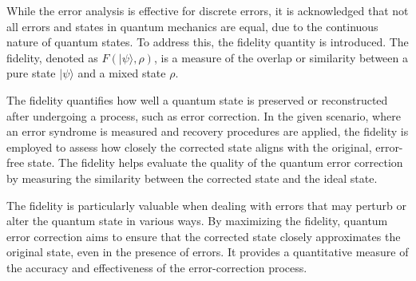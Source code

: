 \documentclass[12pt]{report}
\begin{document}
\begin{minipage}{1 \textwidth}
		While the error analysis is effective for discrete errors, it is acknowledged that not all errors and states in quantum mechanics are equal, due to the continuous nature of quantum states. To address this, the fidelity quantity is introduced. \newline
		The fidelity, denoted as $F(|\psi \rangle, \rho)$, is a measure of the overlap or similarity between a pure state $| \psi \rangle$  and a mixed state $\rho$. \newline
		
		The fidelity quantifies how well a quantum state is preserved or reconstructed after undergoing a process, such as error correction. 
		In the given scenario, where an error syndrome is measured and recovery procedures are applied, the fidelity is employed to assess how closely the corrected state aligns with the original, error-free state. 
		The fidelity helps evaluate the quality of the quantum error correction by measuring the similarity between the corrected state and the ideal state. \newline
		
		
		
	\end{minipage}
	
	\begin{minipage}{1 \textwidth}
		
		The fidelity is particularly valuable when dealing with errors that may perturb or alter the quantum state in various ways. By maximizing the fidelity, quantum error correction aims to ensure that the corrected state closely approximates the original state, even in the presence of errors. It provides a quantitative measure of the accuracy and effectiveness of the error-correction process. \newline
		
	\end{minipage}
	
	\begin{minipage}{1 \textwidth}
		
	\end{minipage}
	
	\begin{minipage}{1 \textwidth}
		
	\end{minipage}
	
	\begin{minipage}{1 \textwidth}
		
	\end{minipage}
	
\end{document}

